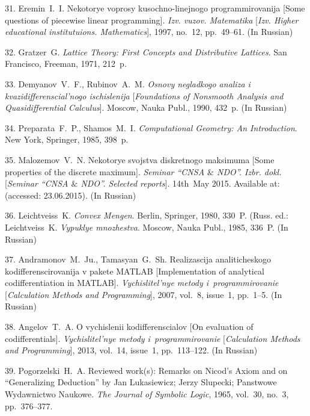 {31.  Eremin~I.~I.  Nekotorye voprosy kusochno-linejnogo
programmirovanija   [Some ques\-tions of piecewise linear
programming]. \textit{Izv. vuzov. Matematika} [\textit{Izv. Higher
educational institutuions. Mathematics}],  1997, no.~12,
pp.~49--61. (In Russian)

32. Gratzer~G. \textit{Lattice Theory: First Concepts and
Distributive Lattices}. San Francisco, Freeman, 1971, 212~p.

33. Demyanov~V.~F., Rubinov~A.~M. \textit{ Osnovy negladkogo
analiza i kvazidifferenscial'nogo ischislenija}
[\textit{Foundations of Nonsmooth Analysis and Quasidifferential
Calculus}].  Moscow, Nauka Publ., 1990, 432~p. (In Russian)

34. Preparata~F.~P., Shamos~M.~I. \textit{Computational Geometry:
An Introduction}. New York, Springer, 1985, 398~p.

35. Malozemov~V.~N. Nekotorye svojstva diskretnogo maksimuma [Some
properties of the discrete maximum]. \textit{Seminar ``CNSA $\&$
NDO''. Izbr. dokl.} [\textit{Seminar ``CNSA $\&$ NDO''. Selected
reports}].  14th~May 2015. Available at:
(accessed: 23.06.2015). (In Russian)

36. Leichtveiss~K. \textit{Convex Mengen}. Berlin, Springer, 1980,
330~P. (Russ. ed.: Leichtveiss~K. \textit{Vypuklye mnozhestva}.
Moscow, Nauka Publ., 1985, 336~P. (In Russian)

37.  Andramonov~M.~Ju., Tamasyan~G.~Sh.  Realizascija
analiticheskogo kodifferensci\-ro\-va\-nija v pakete MATLAB
[Implementation of analytical codifferentiation in MATLAB].
\emph{Vychislitel'nye metody i~programmirovanie}
[\emph{Calculation Methods and Programming}], 2007, vol.~8,
issue~1, pp.~1--5. (In Russian)

38.  Angelov~T.~A.   O vychislenii kodifferenscialov  [On
evaluation of codifferentials]. \emph{Vychislitel'nye metody
i~programmirovanie} [\emph{Calculation Methods and Programming}],
2013, vol.~14, issue~1, pp.~113--122. (In Russian)

39. Pogorzelski~H.~A. Reviewed work(s): Remarks on Nicod's Axiom
and on ``Gen\-er\-al\-iz\-ing Deduction'' by Jan Lukasiewicz;
Jerzy Slupecki; Panstwowe Wydawnictwo Naukowe. \textit{The Journal
of Symbolic Logic}, 1965, vol.~30, no.~3, pp.~376--377.

}
